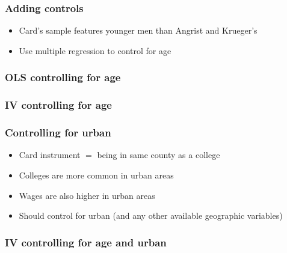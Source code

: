 \begin{frame}[allowframebreaks]
  \frametitle{Adding controls}
  \begin{itemize}
  \item Card's sample features younger men than Angrist and Krueger's
  \item Use multiple regression to control for age
  \end{itemize}
\end{frame}

\begin{frame}\frametitle{OLS controlling for age}
   
\end{frame}

\begin{frame}\frametitle{IV controlling for age}
  
\end{frame}

\begin{frame}\frametitle{Controlling for urban}
  \begin{itemize}
  \item Card instrument $=$ being in same county as a college
  \item Colleges are more common in urban areas
  \item Wages are also higher in urban areas
  \item Should control for urban (and any other available geographic
    variables)    
  \end{itemize}
\end{frame}

\begin{frame}\frametitle{IV controlling for age and urban}
  {\footnotesize{}}
\end{frame}

